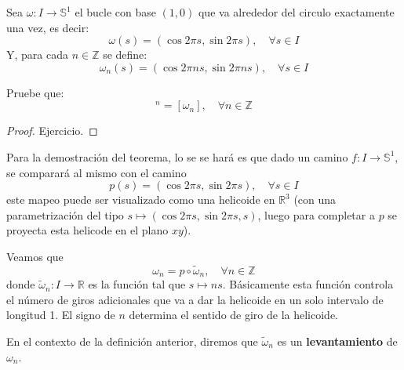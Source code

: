 \documentclass[12pt]{report}
\theoremstyle{largebreak}
\newcommand\cf[3]{\ensuremath{#1:#2\rightarrow#3}}
\begin{document}
    \begin{mydef}
        Sea $\cf{\omega}{I}{\mathbb{S}^1}$ el bucle con base $(1,0)$ que va alrededor del circulo exactamente una vez, es decir:
        \begin{equation*}
            \omega(s)=(\cos 2\pi s,\sin 2\pi s),\quad\forall s\in I
        \end{equation*}
        Y, para cada $n\in\mathbb{Z}$ se define:
        \begin{equation*}
            \omega_n(s)=(\cos 2\pi ns,\sin 2\pi ns),\quad\forall s\in I
        \end{equation*}
    \end{mydef}

    \begin{excer}
        Pruebe que:
        \begin{equation*}
            [\omega]^n=[\omega_n],\quad\forall n\in\mathbb{Z}
        \end{equation*}
    \end{excer}

    \begin{proof}
        Ejercicio.
    \end{proof}

    Para la demostración del teorema, lo se se hará es que dado un camino $\cf{f}{I}{\mathbb{S}^1}$, se comparará al mismo con el camino
    \begin{equation*}
        p(s)=(\cos 2\pi s,\sin 2\pi s),\quad\forall s\in I
    \end{equation*}
    este mapeo puede ser visualizado como una helicoide en $\mathbb{R}^3$ (con una parametrización del tipo $s\mapsto (\cos 2\pi s,\sin 2\pi s, s)$, luego para completar a $p$ se proyecta esta helicode en el plano $xy$).

    \begin{obs}
        Veamos que
        \begin{equation*}
            \omega_n=p\circ\widetilde{\omega}_n,\quad\forall n\in\mathbb{Z}
        \end{equation*}
        donde $\cf{\widetilde{\omega}_n}{I}{\mathbb{R}}$ es la función tal que $s\mapsto ns$. Básicamente esta función controla el número de giros adicionales que va a dar la helicoide en un solo intervalo de longitud 1. El signo de $n$ determina el sentido de giro de la helicoide.
    \end{obs}

    \begin{mydef}
        En el contexto de la definición anterior, diremos que $\widetilde{\omega}_n$ es un \textbf{levantamiento} de $\omega_n$.
    \end{mydef}
\end{document}
